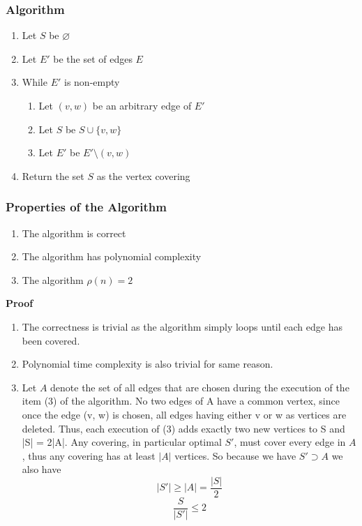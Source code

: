 \documentclass{article}
\theoremstyle{definition}
\begin{document}
\subsubsection{Algorithm}
\begin{enumerate}
    \item Let $S$ be $\varnothing$
    \item Let $E\prime$ be the set of edges $E$
    \item While $E\prime$ is non-empty
        \begin{enumerate}
            \item
                Let $(v,w)$ be an arbitrary edge of $E\prime$
            \item
                Let $S$ be $S \cup \{v,w\}$
            \item
                Let $E\prime$ be $E\prime \setminus (v,w)$
        \end{enumerate}
    \item Return the set $S$ as the vertex covering

\end{enumerate}

\subsubsection{Properties of the Algorithm}
\begin{enumerate}
    \item The algorithm is correct
    \item The algorithm has polynomial complexity
    \item The algorithm $\rho(n) = 2$
\end{enumerate}
\textbf{Proof}
\begin{enumerate}
    \item
        The correctness is trivial
        as the algorithm simply loops until each edge has been covered.
    \item
        Polynomial time complexity is also trivial for same reason.
    \item
        Let $A$ denote the set of all edges that are chosen during the execution of the item (3) of the algorithm.
        No two edges of A have a common vertex, since once the edge (v, w) is chosen, all edges having either v or w as vertices are deleted.
        Thus, each execution of (3) adds exactly two new vertices to S and |S| = 2|A|.
        Any covering, in particular optimal $S\prime$, must cover every edge in $A$, thus any covering has at least $|A|$ vertices.
        So because we have $S\prime \supset A$ we also have
        $$|S\prime| \geq |A| = \frac{|S|}{2}$$
        $$\frac{S}{|S\prime|} \leq 2$$
\end{enumerate}
\end{document}
